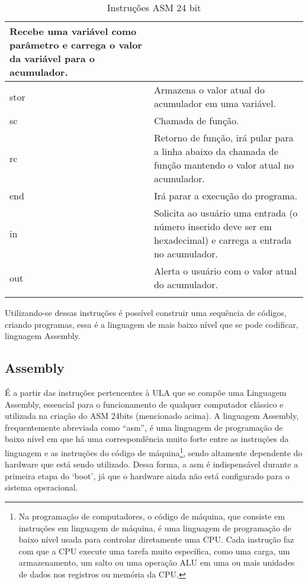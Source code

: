 \begin{longtable}{ |p{3cm}||p{11cm}|  }
  Recebe uma variável como parâmetro e carrega o valor da variável para o acumulador. \\
  \hline
  stor &
  Armazena o valor atual do acumulador em uma variável. \\
  \hline
  sc &
  Chamada de função. \\
  \hline
  rc &
  Retorno de função, irá pular para a linha abaixo da chamada de função mantendo o valor atual no acumulador. \\
  \hline
  end &
  Irá parar a execução do programa. \\
  \hline
  in &
  Solicita ao usuário uma entrada (o número inserido deve ser em hexadecimal) e carrega a entrada no acumulador. \\
  \hline
  out &
  Alerta o usuário com o valor atual do acumulador. \\
  \hline
  \caption{Instruções ASM 24 bit}
  \label{table:2}
\end{longtable}
\vspace{1cm}

Utilizando-se dessas instruções é possível construir uma sequência de códigos, criando programas, essa é a linguagem de mais baixo nível que se pode codificar, linguagem Assembly.

\subsection{Assembly}

É a partir das instruções pertencentes à ULA que se compõe uma  Linguagem Assembly, essencial para o funcionamento de qualquer computador clássico e utilizada na criação do ASM 24bits (mencionado acima). A linguagem Assembly, frequentemente abreviada como ``asm'', é uma linguagem de programação de baixo nível em que há uma correspondência muito forte entre as instruções da linguagem e as instruções do código de máquina\footnote{Na programação de computadores, o código de máquina, que consiste em instruções em linguagem de máquina, é uma linguagem de programação de baixo nível usada para controlar diretamente uma CPU. Cada instrução faz com que a CPU execute uma tarefa muito específica, como uma carga, um armazenamento, um salto ou uma operação ALU em uma ou mais unidades de dados nos registros ou memória da CPU.}, sendo altamente dependente do hardware que está sendo utilizado. Dessa forma, a asm é indispensável durante a primeira etapa do `boot', já que o hardware ainda não está configurado para o sistema operacional. 

